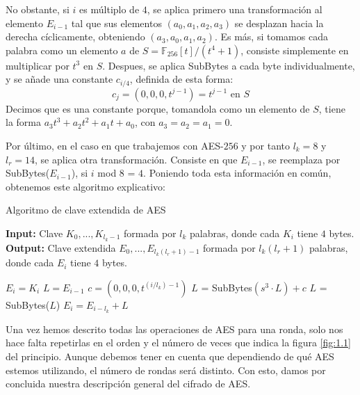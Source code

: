     No obstante, si $i$ es múltiplo de $4$, se aplica primero una transformación al elemento $E_{i-1}$ tal que sus elementos $(a_{0}, a_{1}, a_{2}, a_{3})$ se desplazan hacia la derecha cíclicamente, obteniendo $(a_{3}, a_{0}, a_{1}, a_{2})$. Es más, si tomamos cada palabra como un elemento $a$ de $S = \mathbb{F}_{256}[t]/(t^{4} + 1)$, consiste simplemente en multiplicar por $t^{3}$ en $S$. Despues, se aplica SubBytes a cada byte individualmente, y se añade una constante $c_{i/4}$, definida de esta forma:
    \begin{equation}
        c_{j} = (0, 0, 0, t^{j-1}) = t^{j-1} \text{ en } S
    \end{equation}
    Decimos que es una constante porque, tomandola como un elemento de $S$, tiene la forma $a_{3}t^{3} + a_{2}t^{2} + a_{1}t + a_{0}$, con $a_{3} = a_{2} = a_{1} = 0$.

    Por último, en el caso en que trabajemos con AES-$256$ y por tanto $l_k = 8$ y $l_r = 14$, se aplica otra transformación. Consiste en que $E_{i-1}$, se reemplaza por SubBytes($E_{i-1}$), si $i$ mod $8$ = $4$. Poniendo toda esta información en común, obtenemos este algoritmo explicativo:

    \begin{algorithm}[H]
        \caption{Algoritmo de clave extendida de AES}
        \textbf{Input:} Clave $K_{0}, ..., K_{l_{k}-1}$ formada por $l_{k}$ palabras, donde cada $K_{i}$ tiene $4$ bytes.\\
        \textbf{Output:} Clave extendida $E_{0}, ... , E_{l_{k}(l_{r}+1)-1}$ formada por $l_{k}(l_{r}+1)$ palabras, donde cada $E_{i}$ tiene $4$ bytes.
        \bigskip
        \begin{algorithmic}[1]
            \State $E_{i} = K_{i}$
            \EndFor
            \State $L = E_{i-1}$
            \State $c = (0, 0, 0, t^{(i/l_{k}) - 1})$
            \State $L$ = SubBytes$(s^{3} \cdot L) + c$
            \EndIf
            \State $L$ = SubBytes($L$)
            \EndIf
            \State $E_{i} = E_{i - l_{k}} + L$
            \EndFor
        \end{algorithmic}
    \end{algorithm}

    Una vez hemos descrito todas las operaciones de AES para una ronda, solo nos hace falta repetirlas en el orden y el número de veces que indica la figura \ref{fig:1.1} del principio. Aunque debemos tener en cuenta que dependiendo de qué AES estemos utilizando, el número de rondas será distinto. Con esto, damos por concluida nuestra descripción general del cifrado de AES.

